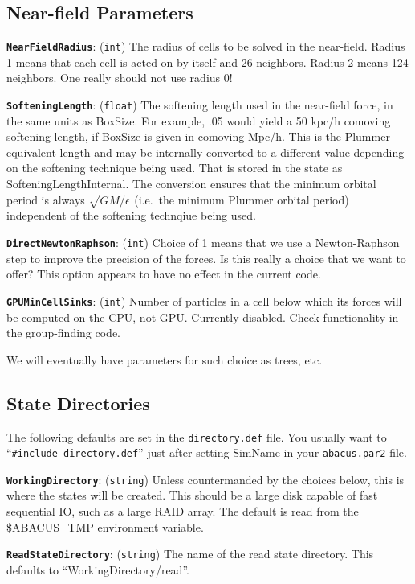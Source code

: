 \documentclass[11pt,preprint]{aastex}
\newcommand{\param}[2]{\medskip\noindent\textbf{\texttt{#1}}: ({\tt #2}) }
\newcommand{\todo}{}
\newcommand{\future}{}
\newcommand{\todo}[1]{{\bf TODO: #1}}
\newcommand{\future}[1]{{\it Future: #1}}
\begin{document}
\subsection{Near-field Parameters}

\param{NearFieldRadius}{int} The radius of cells to be solved in the
near-field.  Radius 1 means that each cell is acted on by itself and
26 neighbors.  Radius 2 means 124 neighbors.  One really should not
use radius 0!

\param{SofteningLength}{float} The softening length used in the near-field
force, in the same units as BoxSize. For example, .05 would yield a 50 kpc/h comoving softening length,
if BoxSize is given in comoving Mpc/h.
This is the Plummer-equivalent length and may be internally converted to a different
value depending on the softening technique being used.  That is stored in the state as
SofteningLengthInternal.  The conversion ensures that the minimum orbital period is always
$\sqrt{GM/\epsilon}$ (i.e.~the minimum Plummer orbital period) independent of the
softening technqiue being used.

\param{DirectNewtonRaphson}{int} Choice of 1 means that we use a
Newton-Raphson step to improve the precision of the forces.
\future{Is this really a choice that we want to offer?}
\todo{This option appears to have no effect in the current code.}

\param{GPUMinCellSinks}{int} Number of particles in a cell below which its forces will be computed on the CPU, not GPU.
\todo{Currently disabled.  Check functionality in the group-finding code.}

\future{We will eventually have parameters for such choice as trees, etc.}

\subsection{State Directories}
The following defaults are set in the \texttt{directory.def} file.  You usually want to ``\texttt{\#include directory.def}''
just after setting SimName in your \texttt{abacus.par2} file.

\param{WorkingDirectory}{string} Unless countermanded by the choices below,
this is where the states will be created.  This should be a large disk capable
of fast sequential IO, such as a large RAID array.  The default is read from
the \$ABACUS\_TMP environment variable.

\param{ReadStateDirectory}{string} The name of the read state directory.
This defaults to ``WorkingDirectory/read''.
\end{document}
